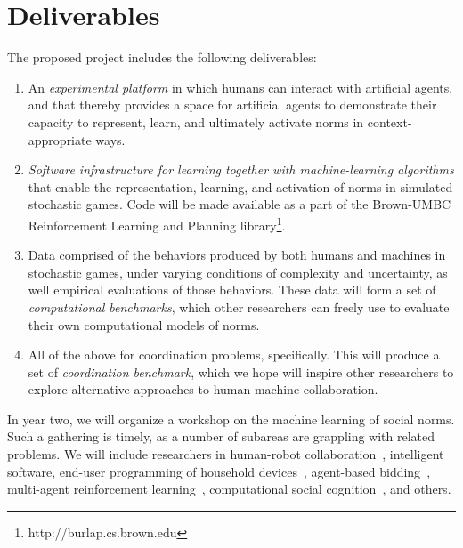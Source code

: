 
\section{Deliverables}

The proposed project includes the following deliverables: 

\begin{enumerate}

\item An {\em experimental platform\/} in which humans can interact
  with artificial agents, and that thereby provides a space for
  artificial agents to demonstrate their capacity to represent, learn,
  and ultimately activate norms in context-appropriate ways.

\item {\em Software infrastructure for learning together with
  machine-learning algorithms\/} that enable the representation,
  learning, and activation of norms in simulated stochastic games.
  Code will be made available as a part of the Brown-UMBC
  Reinforcement Learning and Planning
  library\footnote{http://burlap.cs.brown.edu}.

\item Data comprised of the behaviors produced by both humans and
  machines in stochastic games, under varying conditions of complexity
  and uncertainty, as well empirical evaluations of those behaviors.
  These data will form a set of {\em computational benchmarks}, which
  other researchers can freely use to evaluate their own computational
  models of norms.

\item All of the above for coordination problems, specifically.  This
  will produce a set of {\em coordination benchmark}, which we hope
  will inspire other researchers to explore alternative approaches to
  human-machine collaboration.

\end{enumerate}

In year two, we will organize a workshop on the machine learning of
social norms. Such a gathering is timely, as a number of subareas are
grappling with related problems. We will include researchers in
human-robot collaboration~\cite{gopalan15}, intelligent software,
end-user programming of household devices~\cite{ur14}, agent-based
bidding~\cite{tac:book}, multi-agent reinforcement
learning~\cite{sodomka13}, computational social
cognition~\cite{baker14}, and others.
